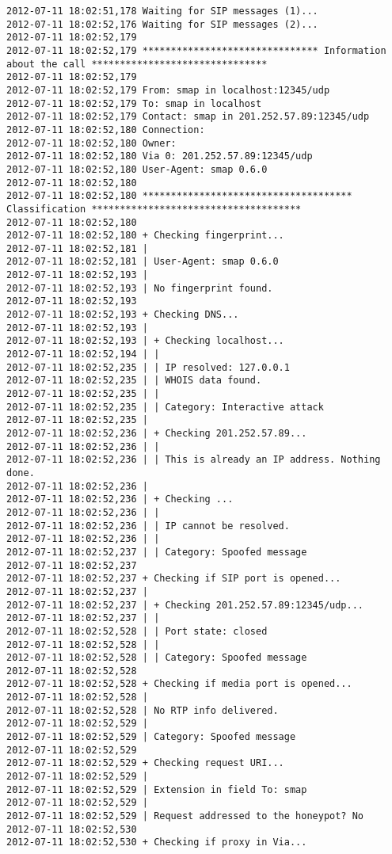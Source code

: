 \documentclass[a4paper,12pt]{report}
\newenvironment{mytinylisting}
{\begin{list}{}{\setlength{\leftmargin}{1em}}\item\tiny\bfseries}
{\end{list}}
\begin{document}
\begin{mytinylisting}
\begin{verbatim}
2012-07-11 18:02:51,178 Waiting for SIP messages (1)...
2012-07-11 18:02:52,176 Waiting for SIP messages (2)...
2012-07-11 18:02:52,179 
2012-07-11 18:02:52,179 ******************************* Information about the call *******************************
2012-07-11 18:02:52,179 
2012-07-11 18:02:52,179 From: smap in localhost:12345/udp
2012-07-11 18:02:52,179 To: smap in localhost
2012-07-11 18:02:52,179 Contact: smap in 201.252.57.89:12345/udp
2012-07-11 18:02:52,180 Connection: 
2012-07-11 18:02:52,180 Owner: 
2012-07-11 18:02:52,180 Via 0: 201.252.57.89:12345/udp
2012-07-11 18:02:52,180 User-Agent: smap 0.6.0
2012-07-11 18:02:52,180 
2012-07-11 18:02:52,180 ************************************* Classification *************************************
2012-07-11 18:02:52,180 
2012-07-11 18:02:52,180 + Checking fingerprint...
2012-07-11 18:02:52,181 |
2012-07-11 18:02:52,181 | User-Agent: smap 0.6.0
2012-07-11 18:02:52,193 |
2012-07-11 18:02:52,193 | No fingerprint found.
2012-07-11 18:02:52,193 
2012-07-11 18:02:52,193 + Checking DNS...
2012-07-11 18:02:52,193 |
2012-07-11 18:02:52,193 | + Checking localhost...
2012-07-11 18:02:52,194 | |
2012-07-11 18:02:52,235 | | IP resolved: 127.0.0.1
2012-07-11 18:02:52,235 | | WHOIS data found.
2012-07-11 18:02:52,235 | |
2012-07-11 18:02:52,235 | | Category: Interactive attack
2012-07-11 18:02:52,235 |
2012-07-11 18:02:52,236 | + Checking 201.252.57.89...
2012-07-11 18:02:52,236 | |
2012-07-11 18:02:52,236 | | This is already an IP address. Nothing done.
2012-07-11 18:02:52,236 |
2012-07-11 18:02:52,236 | + Checking ...
2012-07-11 18:02:52,236 | |
2012-07-11 18:02:52,236 | | IP cannot be resolved.
2012-07-11 18:02:52,236 | |
2012-07-11 18:02:52,237 | | Category: Spoofed message
2012-07-11 18:02:52,237 
2012-07-11 18:02:52,237 + Checking if SIP port is opened...
2012-07-11 18:02:52,237 |
2012-07-11 18:02:52,237 | + Checking 201.252.57.89:12345/udp...
2012-07-11 18:02:52,237 | |
2012-07-11 18:02:52,528 | | Port state: closed
2012-07-11 18:02:52,528 | |
2012-07-11 18:02:52,528 | | Category: Spoofed message
2012-07-11 18:02:52,528 
2012-07-11 18:02:52,528 + Checking if media port is opened...
2012-07-11 18:02:52,528 |
2012-07-11 18:02:52,528 | No RTP info delivered.
2012-07-11 18:02:52,529 |
2012-07-11 18:02:52,529 | Category: Spoofed message
2012-07-11 18:02:52,529 
2012-07-11 18:02:52,529 + Checking request URI...
2012-07-11 18:02:52,529 |
2012-07-11 18:02:52,529 | Extension in field To: smap
2012-07-11 18:02:52,529 |
2012-07-11 18:02:52,529 | Request addressed to the honeypot? No
2012-07-11 18:02:52,530 
2012-07-11 18:02:52,530 + Checking if proxy in Via...

\end{verbatim}
\end{mytinylisting}
\end{document}
